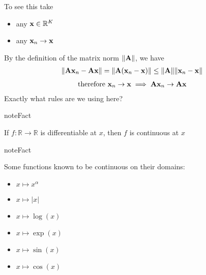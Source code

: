 \documentclass[letterpaper,10pt,english]{jupyterBook}
\begin{document}
\sphinxAtStartPar
To see this take
\begin{itemize}
\item {} 
\sphinxAtStartPar
any \({\bf x} \in \mathbb{R}^K\)

\item {} 
\sphinxAtStartPar
any \({\bf x}_n \to {\bf x}\)

\end{itemize}

\sphinxAtStartPar
By the definition of the matrix norm \(\| {\bf A} \|\), we have
\begin{equation*}
\begin{split}
\| {\bf A} {\bf x}_n - {\bf A} {\bf x} \|
= \| {\bf A} ({\bf x}_n - {\bf x}) \|
\leq \| {\bf A} \| \| {\bf x}_n - {\bf x} \|
\end{split}
\end{equation*}\begin{equation*}
\begin{split}
\text{therefore }
{\bf x}_n \to {\bf x} \implies
{\bf A} {\bf x}_n \to {\bf A} {\bf x} 
\end{split}
\end{equation*}
\sphinxAtStartPar
{} Exactly what rules are we using here?

\begin{sphinxadmonition}{note}{Fact}

\sphinxAtStartPar
If \(f \colon \mathbb{R} \to \mathbb{R}\) is differentiable at \(x\), then \(f\) is continuous at \(x\)
\end{sphinxadmonition}

\begin{sphinxadmonition}{note}{Fact}

\sphinxAtStartPar
Some functions known to be continuous on their domains:
\begin{itemize}
\item {} 
\sphinxAtStartPar
\(x \mapsto x^\alpha\)

\item {} 
\sphinxAtStartPar
\(x \mapsto |x|\)

\item {} 
\sphinxAtStartPar
\(x \mapsto \log(x)\)

\item {} 
\sphinxAtStartPar
\(x \mapsto \exp(x)\)

\item {} 
\sphinxAtStartPar
\(x \mapsto \sin(x)\)

\item {} 
\sphinxAtStartPar
\(x \mapsto \cos(x)\)

\end{itemize}
\end{sphinxadmonition}
\end{document}
